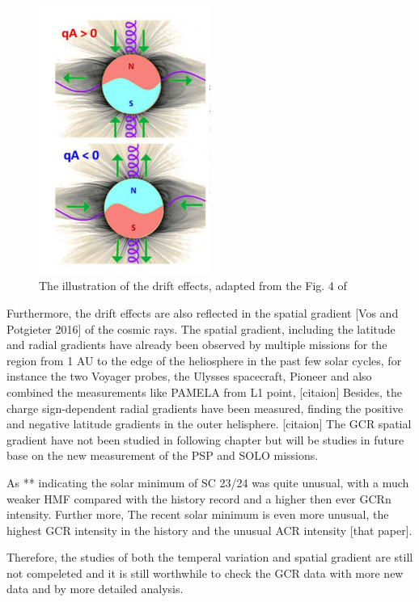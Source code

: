 \begin{figure}
	\centering
	\includegraphics[width = 0.5\textwidth]{images/drift_effect.png}
	\caption{The illustration of the drift effects, adapted from the Fig. 4 of \citep{Rankim 2020?}}
	\label{Fig:drift_effect}	
\end{figure}

Furthermore, the drift effects are also reflected in the spatial gradient [Vos and Potgieter 2016] of the cosmic rays. 
The spatial gradient, including the latitude and radial gradients have already been observed by multiple missions for the region from 1 AU to the edge of the heliosphere in the past few solar cycles, for instance the two Voyager probes, the Ulysses spacecraft, Pioneer and also combined the measurements like PAMELA from L1 point, [citaion]
Besides, the charge sign-dependent radial gradients have been measured, finding the positive and negative latitude gradients in the outer helisphere. [citaion]
The GCR spatial gradient have not been studied in following chapter but will be studies in future base on the new measurement of the PSP and SOLO missions.

As ** indicating the solar minimum of SC 23/24 was quite unusual, with a much weaker \ac{HMF} compared with the history record and a higher then ever GCRn intensity. Further more, The recent solar minimum 
is even more unusual, the highest GCR intensity in the history and the unusual ACR intensity [that paper]. 


Therefore, the studies of both the temperal variation and spatial gradient are still not compeleted and it is still worthwhile to check the GCR data with more new data and by more detailed analysis.

